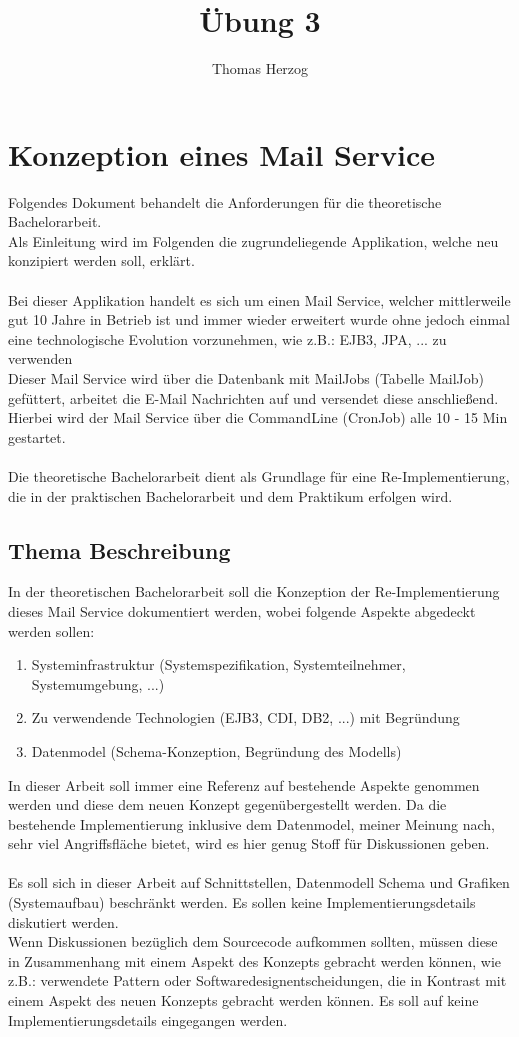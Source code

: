 \documentclass[11pt, a4paper, twoside]{article}   	%
\title{Übung 3}
\author{Thomas Herzog}
\begin{document}
\setlength{\headheight}{15mm}
{\color{myred}
	\section
		{Konzeption eines Mail Service}
}
Folgendes Dokument behandelt die Anforderungen für die theoretische Bachelorarbeit.\\
Als Einleitung wird im Folgenden die zugrundeliegende Applikation, welche neu konzipiert werden soll,  erklärt.\\\\
Bei dieser Applikation handelt es sich um einen Mail Service, welcher mittlerweile gut 10 Jahre in Betrieb ist und immer wieder erweitert wurde ohne jedoch einmal eine technologische Evolution vorzunehmen, wie z.B.: EJB3, JPA, ... zu verwenden\\
Dieser Mail Service wird über die Datenbank mit MailJobs (Tabelle MailJob) gefüttert, arbeitet die E-Mail Nachrichten auf und versendet diese anschließend. Hierbei wird der Mail Service über die CommandLine (CronJob) alle 10 - 15 Min gestartet.\\\\
Die theoretische Bachelorarbeit dient als Grundlage für eine Re-Implementierung, die in der praktischen Bachelorarbeit und dem Praktikum erfolgen wird.\\ 

\subsection{Thema Beschreibung}
In der theoretischen Bachelorarbeit soll die Konzeption der Re-Implementierung dieses Mail Service dokumentiert werden, wobei folgende Aspekte abgedeckt werden sollen:
\begin{enumerate}
	\item Systeminfrastruktur (Systemspezifikation, Systemteilnehmer, Systemumgebung, ...)
	\item Zu verwendende Technologien (EJB3, CDI, DB2, ...) mit Begründung 
	\item Datenmodel (Schema-Konzeption, Begründung des Modells)
\end{enumerate}
In dieser Arbeit soll immer eine Referenz auf bestehende Aspekte genommen werden und diese dem neuen Konzept gegenübergestellt werden. Da die bestehende Implementierung inklusive dem Datenmodel, meiner Meinung nach, sehr viel Angriffsfläche bietet, wird es hier genug Stoff für Diskussionen geben.\\\\
Es soll sich in dieser Arbeit auf Schnittstellen, Datenmodell Schema und Grafiken (Systemaufbau) beschränkt werden. Es sollen keine Implementierungsdetails diskutiert werden.\\
Wenn Diskussionen bezüglich dem Sourcecode aufkommen sollten, müssen diese in Zusammenhang mit einem Aspekt des Konzepts gebracht werden können, wie z.B.: verwendete Pattern oder Softwaredesignentscheidungen, die in Kontrast mit einem Aspekt des neuen Konzepts gebracht werden können. Es soll auf keine Implementierungsdetails eingegangen werden. 
\end{document}
